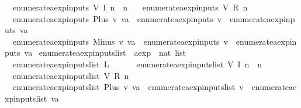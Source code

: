 \begin{isabellebody}
\ \ {\isachardoublequoteopen}enumerate{\isacharunderscore}aexp{\isacharunderscore}inputs\ {\isacharparenleft}V\ {\isacharparenleft}I\ n{\isacharparenright}{\isacharparenright}\ {\isacharequal}\ {\isacharbraceleft}n{\isacharbraceright}{\isachardoublequoteclose}\ {\isacharbar}\isanewline
\ \ {\isachardoublequoteopen}enumerate{\isacharunderscore}aexp{\isacharunderscore}inputs\ {\isacharparenleft}V\ {\isacharparenleft}R\ n{\isacharparenright}{\isacharparenright}\ {\isacharequal}\ {\isacharbraceleft}{\isacharbraceright}{\isachardoublequoteclose}\ {\isacharbar}\isanewline
\ \ {\isachardoublequoteopen}enumerate{\isacharunderscore}aexp{\isacharunderscore}inputs\ {\isacharparenleft}Plus\ v\ va{\isacharparenright}\ {\isacharequal}\ enumerate{\isacharunderscore}aexp{\isacharunderscore}inputs\ v\ {\isasymunion}\ enumerate{\isacharunderscore}aexp{\isacharunderscore}inputs\ va{\isachardoublequoteclose}\ {\isacharbar}\isanewline
\ \ {\isachardoublequoteopen}enumerate{\isacharunderscore}aexp{\isacharunderscore}inputs\ {\isacharparenleft}Minus\ v\ va{\isacharparenright}\ {\isacharequal}\ enumerate{\isacharunderscore}aexp{\isacharunderscore}inputs\ v\ {\isasymunion}\ enumerate{\isacharunderscore}aexp{\isacharunderscore}inputs\ va{\isachardoublequoteclose}\isanewline
\isanewline
{}\isamarkupfalse%
\ enumerate{\isacharunderscore}aexp{\isacharunderscore}inputs{\isacharunderscore}list\ {\isacharcolon}{\isacharcolon}\ {\isachardoublequoteopen}aexp\ {\isasymRightarrow}\ nat\ list{\isachardoublequoteclose}\ \isanewline
\ \ {\isachardoublequoteopen}enumerate{\isacharunderscore}aexp{\isacharunderscore}inputs{\isacharunderscore}list\ {\isacharparenleft}L\ {\isacharunderscore}{\isacharparenright}\ {\isacharequal}\ {\isacharbrackleft}{\isacharbrackright}{\isachardoublequoteclose}\ {\isacharbar}\isanewline
\ \ {\isachardoublequoteopen}enumerate{\isacharunderscore}aexp{\isacharunderscore}inputs{\isacharunderscore}list\ {\isacharparenleft}V\ {\isacharparenleft}I\ n{\isacharparenright}{\isacharparenright}\ {\isacharequal}\ {\isacharbrackleft}n{\isacharbrackright}{\isachardoublequoteclose}\ {\isacharbar}\isanewline
\ \ {\isachardoublequoteopen}enumerate{\isacharunderscore}aexp{\isacharunderscore}inputs{\isacharunderscore}list\ {\isacharparenleft}V\ {\isacharparenleft}R\ n{\isacharparenright}{\isacharparenright}\ {\isacharequal}\ {\isacharbrackleft}{\isacharbrackright}{\isachardoublequoteclose}\ {\isacharbar}\isanewline
\ \ {\isachardoublequoteopen}enumerate{\isacharunderscore}aexp{\isacharunderscore}inputs{\isacharunderscore}list\ {\isacharparenleft}Plus\ v\ va{\isacharparenright}\ {\isacharequal}\ enumerate{\isacharunderscore}aexp{\isacharunderscore}inputs{\isacharunderscore}list\ v\ {\isacharat}\ enumerate{\isacharunderscore}aexp{\isacharunderscore}inputs{\isacharunderscore}list\ va{\isachardoublequoteclose}\ {\isacharbar}\isanewline

\end{isabellebody}
